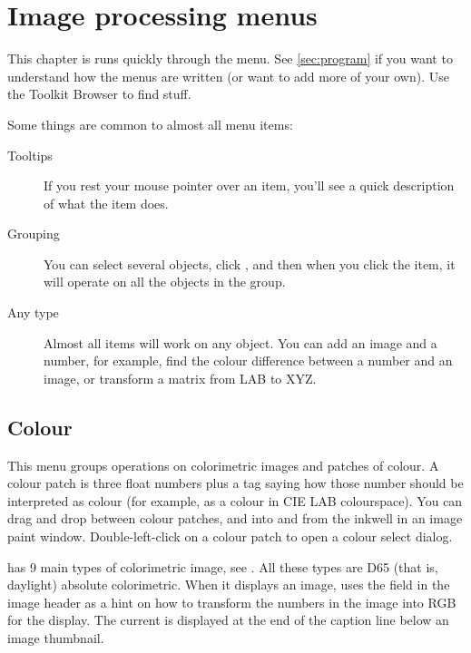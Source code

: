 \chapter{Image processing menus}

\noindent
This chapter is runs quickly through the  menu.  See
\cref{sec:program} if you want to understand how the menus are written
(or want to add more of your own). Use the Toolkit Browser to find stuff.

Some things are common to almost all menu items:

\begin{description}

\item[Tooltips]
	If you rest your mouse pointer over an item,
	you'll see a quick description of what the item does.

\item[Grouping]
	You can select several objects, click , and then
	when you click the item, it will operate on all the objects in the 
	group.

\item[Any type]
	Almost all items will work on any object. You can add an image and a
	number, for example, find the colour difference between a number and
	an image, or transform a matrix from LAB to XYZ.

\end{description}

\section{Colour}

This menu groups operations on colorimetric images and patches of
colour. A colour patch is three float numbers plus a tag saying how those
number should be interpreted as colour (for example, as a colour in CIE LAB
colourspace). You can drag and drop between colour patches, and into and from
the inkwell in an image paint window. Double-left-click on a colour patch to
open a colour select dialog.

\nip{} has 9 main types of colorimetric image, see .
All these types are D65 (that is, daylight) absolute colorimetric.
When it displays an image, \nip{} uses the  field in the image
header as a hint on how to transform the numbers in the image into RGB for
the display. The current  is displayed at the end of the caption
line below an image thumbnail. 

